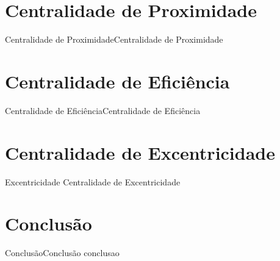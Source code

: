 \documentclass[10pt]{beamer}
\begin{document}
\section{Centralidade de Proximidade}
\begin{frame}{Centralidade de Proximidade}{Centralidade de Proximidade}

\end{frame}

\section{Centralidade de Eficiência}
\begin{frame}{Centralidade de Eficiência}{Centralidade de Eficiência}

\end{frame}

\section{Centralidade de Excentricidade}
\begin{frame}{Excentricidade }{Centralidade de Excentricidade}

\end{frame}

\section{Conclusão}
\begin{frame}{Conclusão}{Conclusão}
conclusao
\end{frame}

{\aauwavesbg
\begin{frame}
\end{frame}}
\end{document}
